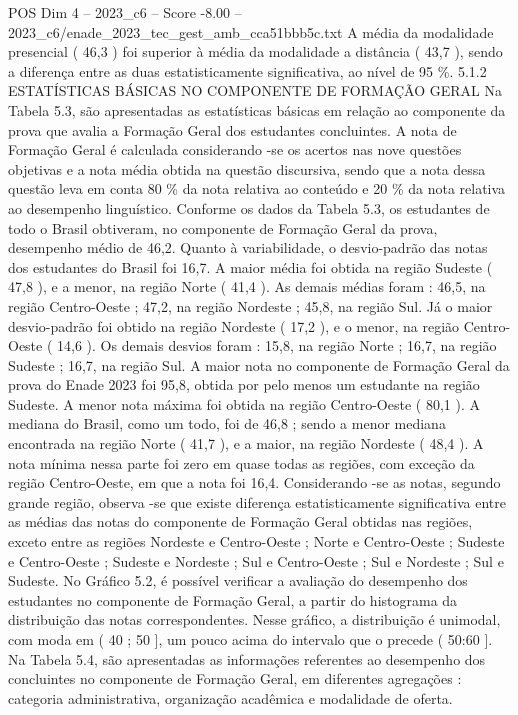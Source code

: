 \begin{textsample}{POS Dim 4 – 2023\_c6 – Score -8.00 – 2023\_c6/enade\_2023\_tec\_gest\_amb\_cca51bbb5c.txt}
A média da modalidade presencial ( 46,3 ) foi superior à média da modalidade a distância ( 43,7 ), sendo a diferença entre as duas estatisticamente significativa, ao nível de 95 \%. 5.1.2 ESTATÍSTICAS BÁSICAS NO COMPONENTE DE FORMAÇÃO GERAL Na Tabela 5.3, são apresentadas as estatísticas básicas em relação ao componente da prova que avalia a Formação Geral dos estudantes concluintes.
A nota de Formação Geral é calculada considerando -se os acertos nas nove questões objetivas e a nota média obtida na questão discursiva, sendo que a nota dessa questão leva em conta 80 \% da nota relativa ao conteúdo e 20 \% da nota relativa ao desempenho linguístico.
Conforme os dados da Tabela 5.3, os estudantes de todo o Brasil obtiveram, no componente de Formação Geral da prova, desempenho médio de 46,2.
Quanto à variabilidade, o desvio-padrão das notas dos estudantes do Brasil foi 16,7.
A maior média foi obtida na região Sudeste ( 47,8 ), e a menor, na região Norte ( 41,4 ).
As demais médias foram : 46,5, na região Centro-Oeste ; 47,2, na região Nordeste ; 45,8, na região Sul.
Já o maior desvio-padrão foi obtido na região Nordeste ( 17,2 ), e o menor, na região Centro-Oeste ( 14,6 ).
Os demais desvios foram : 15,8, na região Norte ; 16,7, na região Sudeste ; 16,7, na região Sul.
A maior nota no componente de Formação Geral da prova do Enade 2023 foi 95,8, obtida por pelo menos um estudante na região Sudeste.
A menor nota máxima foi obtida na região Centro-Oeste ( 80,1 ).
A mediana do Brasil, como um todo, foi de 46,8 ; sendo a menor mediana encontrada na região Norte ( 41,7 ), e a maior, na região Nordeste ( 48,4 ).
A nota mínima nessa parte foi zero em quase todas as regiões, com exceção da região Centro-Oeste, em que a nota foi 16,4.
Considerando -se as notas, segundo grande região, observa -se que existe diferença estatisticamente significativa entre as médias das notas do componente de Formação Geral obtidas nas regiões, exceto entre as regiões Nordeste e Centro-Oeste ; Norte e Centro-Oeste ; Sudeste e Centro-Oeste ; Sudeste e Nordeste ; Sul e Centro-Oeste ; Sul e Nordeste ; Sul e Sudeste.
No Gráfico 5.2, é possível verificar a avaliação do desempenho dos estudantes no componente de Formação Geral, a partir do histograma da distribuição das notas correspondentes.
Nesse gráfico, a distribuição é unimodal, com moda em ( 40 ; 50 ], um pouco acima do intervalo que o precede ( 50:60 ].
Na Tabela 5.4, são apresentadas as informações referentes ao desempenho dos concluintes no componente de Formação Geral, em diferentes agregações : categoria administrativa, organização acadêmica e modalidade de oferta.

\end{textsample}
